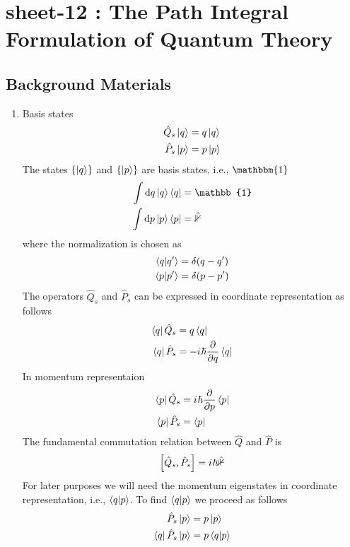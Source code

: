 \chapter{sheet-12 : The Path Integral Formulation of Quantum Theory}
\section{Background Materials}
\begin{enumerate}
	\item Basis states \\
	\begin{align}
		\hat{Q}_s \ket{q} &= q\ket{q} \\
		\hat{P}_s \ket{p} &= p\ket{p} 
	\end{align}
	The states $\{\ket{q}\}$ and $\{\ket{p}\}$ are basis states, i.e., $\mathbbm{1}$
	\begin{align}
		\int \dd{q} \ket{q}\bra{q} &= \mathbb{1} \\
		\int \dd{p} \ket{p}\bra{p} &= \mathbb{\hat{1}} \\
	\end{align}
	where the normalization is chosen as
	\begin{align}
		\braket{q}{q^\prime} &= \delta(q-q^\prime) \\
		\braket{p}{p^\prime} &= \delta(p-p^\prime) 
	\end{align}
	The operators $\hat{Q}_s$ and $\hat{P}_s$ can be expressed in coordinate representation as follows
	\begin{align}
		\bra{q}\hat{Q}_s &= q \bra{q} \\
		\bra{q}\hat{P}_s &= -{i\mkern1mu} \hbar \pdv{q} \bra{q} 
	\end{align}
	In momentum representaion
	\begin{align}
		\bra{p}\hat{Q}_s &= {i\mkern1mu} \hbar \pdv{p} \bra{p} \\
		\bra{p}\hat{P}_s &=  \bra{p} 
	\end{align}
	The fundamental commutation relation between $\hat{Q}$ and $\hat{P}$ is 
	\begin{equation}
		\left[\hat{Q}_s, \hat{P}_s\right] = {i\mkern1mu}
		 \hbar \mathbb{\hat{1}}
	\end{equation}
	For later purposes we will need the momentum eigenstates in coordinate representation, i.e., $\braket{q}{p}$. To find $\braket{q}{p}$ we proceed as follows
	\begin{align}
		\hat{P}_s \ket{p} &= p\ket{p} \\
		\bra{q}\hat{P}_s \ket{p} &= p\bra{q}\ket{p} \\

\end{align}
\end{enumerate}
